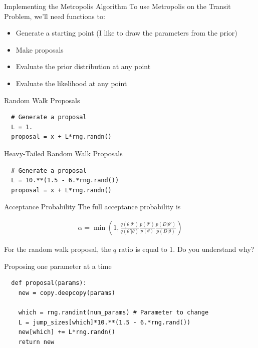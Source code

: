 \begin{frame}[t]{Implementing the Metropolis Algorithm}
To use Metropolis on the Transit Problem, we'll need functions to:
\begin{itemize}
\item Generate a starting point (I like to draw the parameters from the prior)
\item Make proposals
\item Evaluate the prior distribution at any point
\item Evaluate the likelihood at any point
\end{itemize}
\end{frame}


\begin{frame}[t, fragile]{Random Walk Proposals}
\begin{verbatim}
  # Generate a proposal
  L = 1.
  proposal = x + L*rng.randn()
\end{verbatim}
\end{frame}

\begin{frame}[t, fragile]{Heavy-Tailed Random Walk Proposals}
\begin{verbatim}
  # Generate a proposal
  L = 10.**(1.5 - 6.*rng.rand())
  proposal = x + L*rng.randn()
\end{verbatim}
\end{frame}


\begin{frame}[t]{Acceptance Probability}
The full acceptance probability is

\begin{eqnarray}
\alpha =
\min\left(1, \frac{q(\theta|\theta')}{q(\theta'|\theta)}\frac{p(\theta')}{p(\theta)}\frac{p(D|\theta')}{p(D|\theta)}\right)
\end{eqnarray}

For the random walk proposal, the $q$ ratio is equal to 1. Do you understand
why?
\end{frame}

\begin{frame}[t, fragile]{Proposing one parameter at a time}
\begin{verbatim}
  def proposal(params):
    new = copy.deepcopy(params)

    which = rng.randint(num_params) # Parameter to change
    L = jump_sizes[which]*10.**(1.5 - 6.*rng.rand())
    new[which] += L*rng.randn()
    return new
\end{verbatim}
\end{frame}



